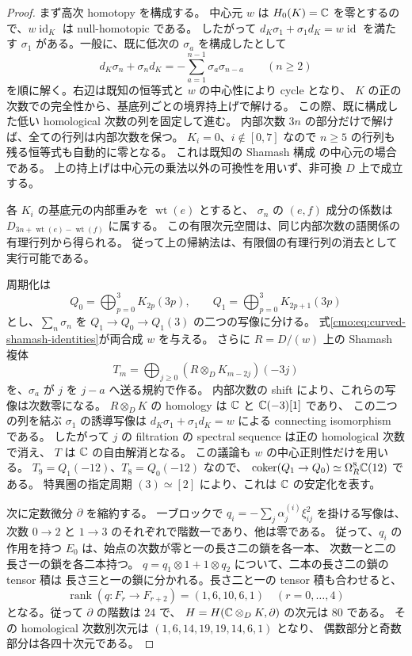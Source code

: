 \begin{proof}
まず高次 homotopy を構成する。
中心元 $w$ は $H_0(K)=\mathbb C$ を零とするので、$w\operatorname{id}_K$ は null-homotopic である。
したがって $d_K\sigma_1+\sigma_1d_K=w\operatorname{id}$ を満たす
$\sigma_1$ がある。一般に、既に低次の $\sigma_a$ を構成したとして
\[
 d_K\sigma_n+\sigma_nd_K=-\sum_{a=1}^{n-1}\sigma_a\sigma_{n-a}
 \qquad(n\ge2)
\]
を順に解く。右辺は既知の恒等式と $w$ の中心性により cycle となり、
$K$ の正の次数での完全性から、基底列ごとの境界持上げで解ける。
この際、既に構成した低い homological 次数の列を固定して進む。
内部次数 $3n$ の部分だけで解けば、全ての行列は内部次数を保つ。
$K_i=0$、$i\notin[0,7]$ なので $n\ge5$ の行列も残る恒等式も自動的に零となる。
これは既知の Shamash 構成
\cite[Definition~3.4.1, Proposition~3.4.2]{CMOEisenbudPeeva}の中心元の場合である。
上の持上げは中心元の乗法以外の可換性を用いず、非可換 $D$ 上で成立する。

各 $K_i$ の基底元の内部重みを $\operatorname{wt}(e)$ とすると、
$\sigma_n$ の $(e,f)$ 成分の係数は
$D_{3n+\operatorname{wt}(e)-\operatorname{wt}(f)}$ に属する。
この有限次元空間は、同じ内部次数の語関係の有理行列から得られる。
従って上の帰納法は、有限個の有理行列の消去として実行可能である。

周期化は
\[
 Q_0=\bigoplus_{p=0}^3K_{2p}(3p),\qquad
 Q_1=\bigoplus_{p=0}^3K_{2p+1}(3p)
\]
とし、$\sum_n\sigma_n$ を $Q_1\to Q_0\to Q_1(3)$ の二つの写像に分ける。
式\eqref{cmo:eq:curved-shamash-identities}が両合成 $w$ を与える。
さらに $R=D/(w)$ 上の Shamash 複体
\[
 T_m=\bigoplus_{j\ge0}(R\otimes_D K_{m-2j})(-3j)
\]
を、$\sigma_a$ が $j$ を $j-a$ へ送る規約で作る。
内部次数の shift により、これらの写像は次数零になる。
$R\otimes_D K$ の homology は $\mathbb C$ と $\mathbb C(-3)[1]$ であり、
この二つの列を結ぶ $\sigma_1$ の誘導写像は
$d_K\sigma_1+\sigma_1d_K=w$ による connecting isomorphism である。
したがって $j$ の filtration の spectral sequence は正の homological 次数で消え、
$T$ は $\mathbb C$ の自由解消となる。
この議論も $w$ の中心正則性だけを用いる。
$T_9=Q_1(-12)$、$T_8=Q_0(-12)$ なので、
$\operatorname{coker}(Q_1\to Q_0)\simeq\Omega_R^8\mathbb C(12)$ である。
特異圏の指定周期 $(3)\simeq[2]$ により、これは $\mathbb C$ の安定化を表す。

次に定数微分 $\partial$ を縮約する。
一ブロックで $q_i=-\sum_j\alpha_j^{(i)}\xi_{ij}^2$ を掛ける写像は、
次数 $0\to2$ と $1\to3$ のそれぞれで階数一であり、他は零である。
従って、$q_i$ の作用を持つ $E_0$ は、始点の次数が零と一の長さ二の鎖を各一本、
次数一と二の長さ一の鎖を各二本持つ。
$q=q_1\otimes1+1\otimes q_2$ について、二本の長さ二の鎖の tensor 積は
長さ三と一の鎖に分かれる。長さ二と一の tensor 積も合わせると、
\begin{equation}\label{cmo:eq:curved-q-ranks}
 \operatorname{rank}(q:F_r\to F_{r+2})=(1,6,10,6,1)
 \quad (r=0,\ldots,4)
\end{equation}
となる。従って $\partial$ の階数は $24$ で、
$H=H(\mathbb C\otimes_D K,\partial)$ の次元は $80$ である。
その homological 次数別次元は $(1,6,14,19,19,14,6,1)$ となり、
偶数部分と奇数部分は各四十次元である。


\end{proof}
